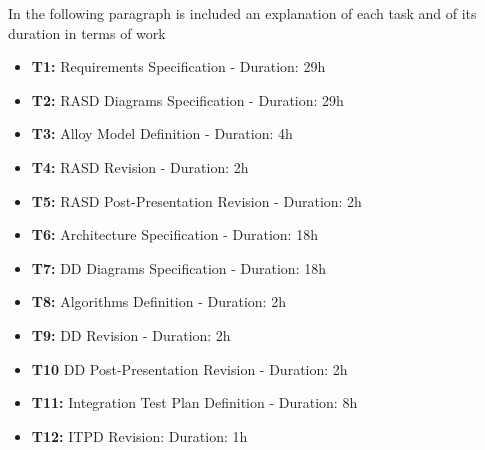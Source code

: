\documentclass[11pt,titlepage]{article} %
\begin{document}
In the following paragraph is included an explanation of each task and of its duration in terms of work
\begin{itemize}
 \item \textbf{T1:} Requirements Specification - Duration: 29h
 \item \textbf{T2:} RASD Diagrams Specification - Duration: 29h
 \item \textbf{T3:} Alloy Model Definition - Duration: 4h
 \item \textbf{T4:} RASD Revision - Duration: 2h
 \item \textbf{T5:} RASD Post-Presentation Revision - Duration: 2h
 \item \textbf{T6:} Architecture Specification - Duration: 18h
 \item \textbf{T7:} DD Diagrams Specification - Duration: 18h
 \item \textbf{T8:} Algorithms Definition - Duration: 2h
 \item \textbf{T9:} DD Revision - Duration: 2h
 \item \textbf{T10} DD Post-Presentation Revision - Duration: 2h
 \item \textbf{T11:} Integration Test Plan Definition - Duration: 8h
 \item \textbf{T12:} ITPD Revision: Duration: 1h
\end{itemize}

\newpage
\end{document}
